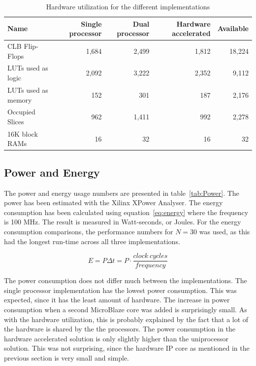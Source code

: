 \documentclass[11pt]{article}
\begin{document}
\begin{table}[htbp]
  \centering
  \begin{tabular}{lrrrr}
    \toprule
    Name & Single processor & Dual processor & Hardware accelerated & Available \\
    \midrule
    CLB Flip-Flops & 1,684 & 2,499 & 1,812 & 18,224 \\ %
    LUTs used as logic & 2,092 & 3,222 & 2,352 & 9,112 \\
    LUTs used as memory & 152 & 301 & 187 & 2,176 \\ %
    Occupied Slices & 962 & 1,411 & 992 & 2,278 \\
    16K block RAMs & 16 & 32 & 16 & 32 \\
    \bottomrule
  \end{tabular}
  \caption{Hardware utilization for the different implementations}
  \label{tab:Utilization}
\end{table}

\subsection{Power and Energy}
The power and energy usage numbers are presented in table~\ref{tab:Power}. The power has been estimated with the Xilinx XPower Analyser. The energy consumption has been calculated using equation~\eqref{eq:energy} where the frequency is 100 MHz. The result is measured in Watt-seconds, or Joules. For the energy consumption comparisons, the performance numbers for $N=30$ was used, as this had the longest run-time across all three implementations.

\begin{equation}
  \label{eq:energy}
  E = P \Delta t = P \cdot \frac{clock\ cycles}{frequency}
\end{equation}

The power consumption does not differ much between the implementations. The single processor implementation has the lowest power consumption. This was expected, since it has the least amount of hardware. The increase in power consumption when a second MicroBlaze core was added is surprisingly small. As with the hardware utilization, this is probably explained by the fact that a lot of the hardware is shared by the the processors. The power consumption in the hardware accelerated solution is only slightly higher than the uniprocessor solution. This was not surprising, since the hardware IP core as mentioned in the previous section is very small and simple.
\end{document}
